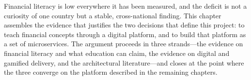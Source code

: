 
Financial literacy is low everywhere it has been measured, and the deficit is
not a curiosity of one country but a stable, cross-national finding. This
chapter assembles the evidence that justifies the two decisions that define
this project: to teach financial concepts through a digital platform, and to
build that platform as a set of microservices. The argument proceeds in three
strands---the evidence on financial literacy and what education can claim, the
evidence on digital and gamified delivery, and the architectural
literature---and closes at the point where the three converge on the platform
described in the remaining chapters.

